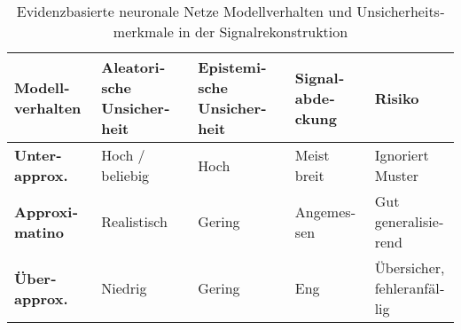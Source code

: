 \begin{otherlanguage}{ngerman}
\begin{table}[h!]
\centering
\begin{tabular}{@{}lllll@{}}
\toprule
\textbf{Modellverhalten} & \textbf{\gls{Aleatorische Unsicherheit}} & \textbf{\gls{Epistemische Unsicherheit}} & \textbf{Signalabdeckung} & \textbf{Risiko} \\
\midrule
\textbf{Unterapprox.}   & Hoch / beliebig & Hoch    & Meist breit   & Ignoriert Muster \\
\textbf{Approximatino}  & Realistisch     & Gering  & Angemessen    & Gut generalisierend \\
\textbf{Überapprox.}    & Niedrig         & Gering  & Eng           & Übersicher, fehleranfällig \\
\bottomrule
\end{tabular}
\caption{\gls{Evidenzbasierte neuronale Netze} Modellverhalten und Unsicherheitsmerkmale in der Signalrekonstruktion}
\end{table}











\end{otherlanguage}
